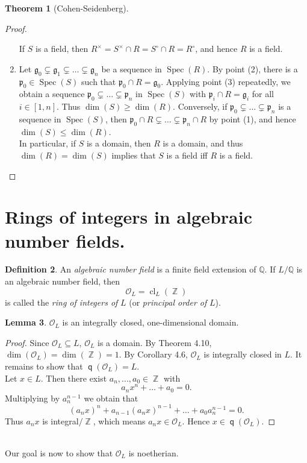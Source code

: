\documentclass[12pt,a4paper]{report}
\theoremstyle{definition}
\newtheorem{theorem}{Theorem}[chapter] %
\newtheorem{lemma}[theorem]{Lemma}
\newtheorem{defn}[theorem]{Definition}
\theoremstyle{num.custom-title}
\DeclareMathOperator{\Z}{\mathbb{Z}}
\DeclareMathOperator{\sse}{\subseteq}
\DeclareMathOperator{\cl}{cl}
\DeclareMathOperator{\Spec}{Spec}
\DeclareMathOperator{\q}{\mathsf{q}}
\newcommand{\Q}{\mathbb{Q}}
\newcommand{\g}{\mathfrak{g}}
\newcommand{\p}{\mathfrak{p}}
\renewcommand{\O}{\mathcal{O}}
\begin{document}
\begin{theorem}[Cohen-Seidenberg]
\begin{proof}
\begin{enumerate}
If $S$ is a field, then $R^\times = S^\times \cap R = S^\circ \cap R = R^\circ$, and hence $R$ is a field.
\item Let $\g_0 \subsetneq \g_1 \subsetneq \ldots \subsetneq \g_n$ be a sequence in $\Spec(R)$. By point (2), there is a $\p_0 \in \Spec(S)$ such that $\p_0 \cap R = \g_0$. Applying point (3) repeatedly, we obtain a sequence $\p_0 \subsetneq \ldots \subsetneq \p_n$ in $\Spec(S)$ with $\p_i \cap R = \g_i$ for all $i \in [1,n]$. Thus $\dim(S) \geq \dim(R)$. Conversely, if $\p_0 \subsetneq \ldots \subsetneq \p_n$ is a sequence in $\Spec(S)$, then $\p_0 \cap R \subsetneq \ldots \subsetneq \p_n \cap R$ by point (1), and hence $\dim(S) \leq \dim(R)$.\\
In particular, if $S$ is a domain, then $R$ is a domain, and thus $\dim(R)=\dim(S)$ implies that $S$ is a field iff $R$ is a field.
\end{enumerate}
\end{proof}
\end{theorem}


\section{Rings of integers in algebraic number fields.}

\begin{defn}
An \emph{algebraic number field} is a finite field extension of $\Q$. If $L/\Q$ is an algebraic number field, then
\[
\O_L = \cl_L(\Z)
\]
is called the \emph{ring of integers of} $L$ (or \emph{principal order of} $L$).
\end{defn}

\begin{lemma}
$\O_L$ is an integrally closed, one-dimensional domain.
\begin{proof}
Since $\O_L \sse L$, $\O_L$ is a domain. By Theorem 4.10, $\dim(\O_L)=\dim(\Z)=1$. By Corollary 4.6, $\O_L$ is integrally closed in $L$. It remains to show that $\q(\O_L)=L$. \\
Let $x \in L$. Then there exist $a_n,...,a_0 \in \Z$ with
\[
a_n x^n + \ldots + a_0 = 0.
\]
Multiplying by $a_n^{n-1}$ we obtain that
\[
(a_n x)^n + a_{n-1} (a_n x)^{n-1} + \ldots + a_0 a_n^{n-1} = 0.
\]
Thus $a_n x$ is integral$/\Z$, which means $a_n x \in \O_L$. Hence $x \in \q(\O_L)$.
\end{proof}
\end{lemma}
\ \\
Our goal is now to show that $\O_L$ is noetherian.\\
\end{document}
